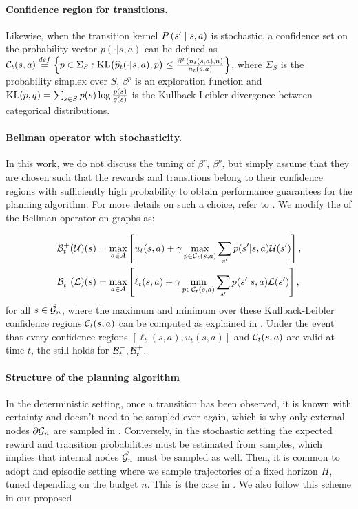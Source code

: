 \documentclass[runningheads]{llncs}
\begin{document}
\paragraph{Confidence region for transitions.}

Likewise, when the transition kernel $P\left(s' \;\middle|\; s,a\right)$ is stochastic, a confidence set on the probability vector $p(\cdot|s,a)$ can be defined as
$\mathcal{C}_t(s,a) \stackrel{def}{=} \left\{p\in \Sigma_S :  \operatorname{KL}\!\big(\widehat{p}_t(\cdot|s,a),p\big) \leq \frac {\beta^p(n_t(s,a), n)} {n_t(s,a)}\right\}$,
where $\Sigma_S$ is the probability simplex over $S$, $\beta^p$ is an exploration function and $\operatorname{KL}(p,q)= \sum_{s \in S}  p(s) \log \tfrac{ p(s)} {{q}(s)}$ is the Kullback-Leibler divergence between categorical distributions.

\paragraph{Bellman operator with stochasticity.}

In this work, we do not discuss the tuning of $\beta^r$, $\beta^p$, but simply assume that they are chosen such that the rewards and transitions belong to their confidence regions with sufficiently high probability to obtain performance guarantees for the  planning algorithm. For more details on such a choice, refer to \citep[e.g.][]{Leurent2019practical, MDPGapE2020}. We modify the  of the Bellman operator on graphs as:

\begin{align*}
\mathcal{B}_t^+(\mathcal{U})(s) &= \max_{a\in A} \left[u_t(s,a) + \gamma \max_{p \in \mathcal{C}_t(s,a)} \sum_{s'} p(s'|s,a) \mathcal{U}(s')\right], \\
\mathcal{B}_t^-(\mathcal{L})(s) &= \max_{a\in A} \left[\ell_t(s,a) + \gamma \min_{p \in \mathcal{C}_t(s,a)} \sum_{s'} p(s'|s,a)\mathcal{L}(s')\right],
\end{align*}
for all $s\in\mathring{\mathcal{G}_n}$, where the maximum and minimum over these Kullback-Leibler confidence regions $\mathcal{C}_t(s,a)$ can be computed as explained in \citep[Appendix A of][]{Filippi2010optimism}. Under the event that every confidence regions $[\ell_t(s,a), u_t(s,a)]$ and $\mathcal{C}_t(s,a)$ are valid at time $t$, the  still holds for $\mathcal{B}_t^-, \mathcal{B}_t^+$.

\paragraph{Structure of the planning algorithm}

In the deterministic setting, once a transition has been observed, it is known with certainty and doesn't need to be sampled ever again, which is why only external nodes ${\partial \mathcal{G}_n}$ are sampled in \GBOPD. Conversely, in the stochastic setting the expected reward and transition probabilities must be estimated from samples, which implies that internal nodes $\mathring{\mathcal{G}_n}$ must be sampled as well. Then, it is common to adopt and episodic setting where we sample trajectories of a fixed horizon $H$, tuned depending on the budget $n$. This is the case in  \citep[e.g.][]{Kearns02SS,Kocsis06UCT,Bubeck2010open,Feldman14BRUE,Leurent2019practical,MDPGapE2020}. We also follow this scheme in our proposed \GBOP
\end{document}
